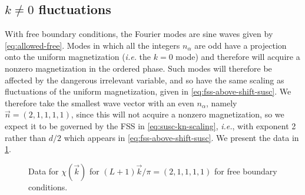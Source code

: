 \subsection{$k \neq 0$ fluctuations}

With free boundary conditions, the Fourier modes are sine waves given by
\cref{eq:allowed-free}. Modes in which all the integers $n_{\alpha}$ are odd
have a projection onto the uniform magnetization (\emph{i.e.} the $k=0$ mode)
and therefore will acquire a nonzero magnetization in the ordered phase. Such
modes will therefore be affected by the dangerous irrelevant variable, and so
have the same scaling as fluctuations of the uniform magnetization, given in
\cref{eq:fss-above-shift-susc}. We therefore take the smallest wave vector with
an even $n_{\alpha}$, namely $\vec{n}=(2,1,1,1,1)$, since this will not acquire
a nonzero magnetization, so we expect it to be governed by the FSS in
\cref{eq:susc-kn-scaling}, \emph{i.e.}, with exponent 2 rather than $d/2$ which
appears in \cref{eq:fss-above-shift-susc}. We present the data in
\cref{fig:chi-f-k21}.
\begin{figure}
  \centering
  
  \caption[
    Wavevector-dependent susceptibility $\chi(\vec{k})$ for
    $(L+1)\vec{k}/\pi=(2,1,1,1,1)$ for the five-dimensional Ising model with
    free boundary conditions.
  ]
  {
    Data for $\chi(\vec{k})$ for $(L+1)\vec{k}/\pi=(2,1,1,1,1)$ for free
    boundary conditions.
  }
  \label{fig:chi-f-k21}
\end{figure}

